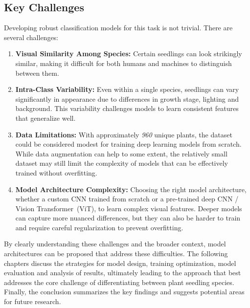 \subsection{Key Challenges}
Developing robust classification models for this task is not trivial. There are several challenges:

\begin{enumerate}
    \item \textbf{Visual Similarity Among Species:} Certain seedlings can look strikingly similar, making it difficult for both humans and machines to distinguish between them.
    \item \textbf{Intra-Class Variability:} Even within a single species, seedlings can vary significantly in appearance due to differences in growth stage, lighting and background. This variability challenges models to learn consistent features that generalize well.
    \item \textbf{Data Limitations:} With approximately \textit{960} unique plants, the dataset could be considered modest for training deep learning models from scratch. While data augmentation can help to some extent, the relatively small dataset may still limit the complexity of models that can be effectively trained without overfitting.
    \item \textbf{Model Architecture Complexity:} Choosing the right model architecture, whether a custom CNN trained from scratch or a pre-trained deep CNN / Vision Transformer~(ViT), to learn complex visual features. Deeper models can capture more nuanced differences, but they can also be harder to train and require careful regularization to prevent overfitting.
\end{enumerate}

By clearly understanding these challenges and the broader context, model architectures can be proposed that address these difficulties. The following chapters discuss the strategies for model design, training optimization, model evaluation and analysis of results, ultimately leading to the approach that best addresses the core challenge of differentiating between plant seedling species. Finally, the conclusion summarizes the key findings and suggests potential areas for future research.